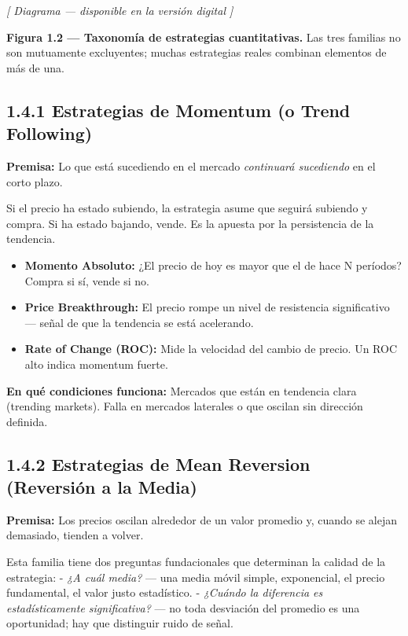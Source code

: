 \documentclass[12pt, a4paper, twoside, openright]{book}
\providecommand{\tightlist}{%
  \setlength{\itemsep}{2pt}\setlength{\parskip}{0pt}}
\renewenvironment{quote}{%
  \begin{mdframed}[style=quotestyle]%
  \itshape\color{bkblue}%
}{%
  \end{mdframed}%
}
\numberwithin{figure}{chapter}
\numberwithin{table}{chapter}
\begin{document}
\emph{{[} Diagrama --- disponible en la versión digital {]}}

\textbf{Figura 1.2 --- Taxonomía de estrategias cuantitativas.} Las tres
familias no son mutuamente excluyentes; muchas estrategias reales
combinan elementos de más de una.

\subsection{1.4.1 Estrategias de Momentum (o Trend
Following)}\label{estrategias-de-momentum-o-trend-following}

\textbf{Premisa:} Lo que está sucediendo en el mercado \emph{continuará
sucediendo} en el corto plazo.

Si el precio ha estado subiendo, la estrategia asume que seguirá
subiendo y compra. Si ha estado bajando, vende. Es la apuesta por la
persistencia de la tendencia.

\begin{itemize}
\tightlist
\item
  \textbf{Momento Absoluto:} ¿El precio de hoy es mayor que el de hace N
  períodos? Compra si sí, vende si no.
\item
  \textbf{Price Breakthrough:} El precio rompe un nivel de resistencia
  significativo --- señal de que la tendencia se está acelerando.
\item
  \textbf{Rate of Change (ROC):} Mide la velocidad del cambio de precio.
  Un ROC alto indica momentum fuerte.
\end{itemize}

\begin{quote}
\textbf{En qué condiciones funciona:} Mercados que están en tendencia
clara (trending markets). Falla en mercados laterales o que oscilan sin
dirección definida.
\end{quote}

\subsection{1.4.2 Estrategias de Mean Reversion (Reversión a la
Media)}\label{estrategias-de-mean-reversion-reversiuxf3n-a-la-media}

\textbf{Premisa:} Los precios oscilan alrededor de un valor promedio y,
cuando se alejan demasiado, tienden a volver.

Esta familia tiene dos preguntas fundacionales que determinan la calidad
de la estrategia: - \emph{¿A cuál media?} --- una media móvil simple,
exponencial, el precio fundamental, el valor justo estadístico. -
\emph{¿Cuándo la diferencia es estadísticamente significativa?} --- no
toda desviación del promedio es una oportunidad; hay que distinguir
ruido de señal.
\end{document}
